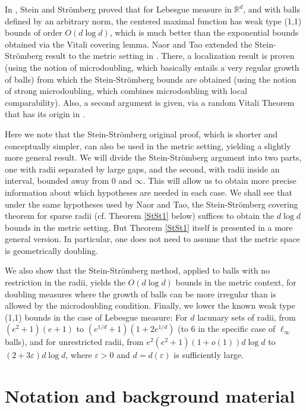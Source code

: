 \documentclass[12pt]{amsart}
\theoremstyle{definition}
\theoremstyle{parrafo}
\begin{document}
In \cite{StSt}, Stein and Str\"omberg proved that for Lebesgue measure in $\mathbb{R}^d$,
and with balls defined by an arbitrary norm, the centered maximal function has weak type (1,1)
bounds of order $O(d \log d)$, which is much better than the exponential bounds obtained via
the Vitali covering lemma.  Naor and Tao   extended  the  Stein-Str\"omberg
 result to the metric setting in  \cite{NaTa}.
 There, a localization result is proven (using the notion of  microdoubling, which basically entails a
 very regular growth of balls) from which the  Stein-Str\"omberg 
 bounds
 are obtained (using  the notion of  strong microdoubling, which combines microdoubling with
 local comparability). 
Also, a second argument is given, via a random Vitali Theorem that has  its
 origin in \cite{Li}. 
 
 
 Here we note that the Stein-Str\"omberg original proof,
 which is shorter and conceptually simpler, can also be used in the metric setting,
 yielding a slightly more general result.
 We will
divide the  Stein-Str\"omberg argument  into two parts, one with radii separated by large gaps, and the second, with radii inside
an interval, bounded away from 0 and $\infty$. This will allow us to obtain more precise 
information about which hypotheses are needed in each case. We shall see that under the same hypotheses
used by Naor and Tao, the  Stein-Str\"omberg covering theorem for sparse radii  (cf. Theorem \ref{StSt1} below)
suffices to obtain the $d\log d$ bounds in the metric setting. But Theorem \ref{StSt1} itself is presented
in a more general version. In particular, one does not need to assume that the metric space is
geometrically doubling.

We also show that the Stein-Str\"omberg method, applied to balls with no restriction in the  radii, yields the  $O(d \log d)$ 
bounds in the metric context, for doubling measures where the growth of balls can be more 
irregular than is allowed by the microdoubling condition. 
Finally, we lower the known weak type (1,1) bounds in the case of Lebesgue measure:
For $d$ lacunary sets of radii, from $(e^2 + 1) (e + 1)$ to 
$(e^{1/d} + 1) (1 + 2  e^{1/d})$ (to 6 in the specific case of $\ell_\infty$ balls),
and for unrestricted radii, from
 $e^2 (e^2 + 1) (1 + o(1)) d \log d$ to $(2 +  3 \varepsilon) d \log d$, where   $\varepsilon > 0$
 and  $d = d(\varepsilon)$ is sufficiently large.

\section {Notation and background material} 
\end{document}
